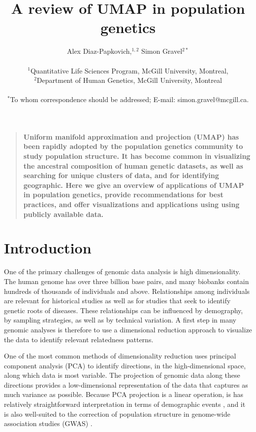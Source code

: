 \documentclass[12pt]{article}
\title{A review of UMAP in population genetics}
\author
{Alex Diaz-Papkovich,$^{1,2}$ Simon Gravel$^{2\ast}$\\
\\
\normalsize{$^{1}$Quantitative Life Sciences Program, McGill University, Montreal,}\\
\normalsize{$^{2}$Department of Human Genetics, McGill University, Montreal}\\
\\
\normalsize{$^\ast$To whom correspondence should be addressed; E-mail:  simon.gravel@mcgill.ca.}
}
\date{}
\newenvironment{sciabstract}{%
\begin{quote} \bf}
{\end{quote}}
\begin{document}
 


\baselineskip24pt


\maketitle 



\begin{sciabstract}
Uniform manifold approximation and projection (UMAP) has been rapidly adopted by the population genetics community to study population structure. It has become common in visualizing the ancestral composition of human genetic datasets, as well as searching for unique clusters of data, and for identifying geographic. Here we give an overview of applications of UMAP in population genetics, provide recommendations for best practices, and offer visualizations and applications using using publicly available data.
\end{sciabstract}

\section*{Introduction}

One of the primary challenges of genomic data analysis is high dimensionality. The human genome has over three billion base pairs, and many biobanks contain hundreds of thousands of individuals and above. Relationships among individuals are relevant for historical studies as well as for studies that seek to identify genetic roots of diseases. These relationships can be influenced by demography, by sampling strategies, as well as by technical variation. A first step in many genomic analyses is therefore to use a dimensional reduction approach to visualize the data to identify relevant relatedness patterns. 

One of the most common methods of dimensionality reduction uses principal component analysis (PCA) to identify directions, in the high-dimensional space, along which data is most variable. The projection of genomic data along these directions provides a low-dimensional representation of the data that captures as much variance as possible. Because PCA projection is a linear operation, is has relatively straightforward interpretation in terms of demographic events \cite{}, and it is also well-suited to the correction of population structure in genome-wide association studies (GWAS) \cite{patterson2006population}.
\end{document}
